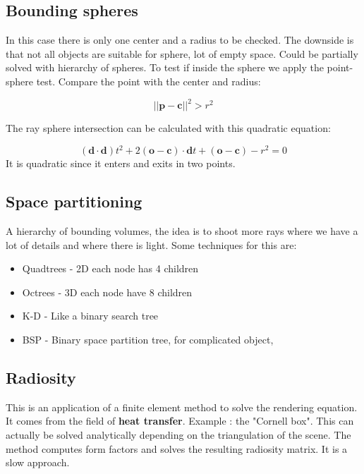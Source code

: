 \subsection*{Bounding spheres}
In this case there is only one center and a radius to be checked. The downside is that not all objects are suitable for sphere, lot of empty space. Could be partially solved with hierarchy of spheres. To test if inside the sphere we apply the point-sphere test. Compare the point with the center and radius:

	\begin{equation}
		||\textbf{p}-\textbf{c}||^{2} > r^{2}
	\end{equation}

The ray sphere intersection can be calculated with this quadratic equation:
	
	\begin{equation}
		(\textbf{d} \cdot \textbf{d})t^{2} + 2(\textbf{o}-\textbf{c}) \cdot  \textbf{d}t + (\textbf{o}-\textbf{c}) - r^{2} = 0
	\end{equation}
It is quadratic since it enters and exits in two points. 

\subsection*{Space partitioning}
A hierarchy of bounding volumes, the idea is to shoot more rays where we have a lot of details and where there is light. Some techniques for this are:

	\begin{itemize}
		\item Quadtrees - 2D each node has 4 children
		\item Octrees - 3D each node have 8 children
		\item K-D - Like a binary search tree
		\item BSP - Binary space partition tree, for complicated object, 
	\end{itemize}

\subsection*{Radiosity}
This is an application of a finite element method to solve the rendering equation. It comes from the field of \textbf{heat transfer}. Example : the "Cornell box". This can actually be solved analytically depending on the triangulation of the scene. The method computes form factors and solves the resulting radiosity matrix. It is a slow approach. 

